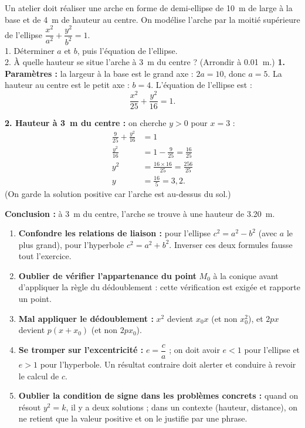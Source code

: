 \documentclass[11pt]{article}
\begin{document}
\begin{exoresolu}
Un atelier doit réaliser une arche en forme de demi-ellipse de \SI{10}{m} de large à la base et de \SI{4}{m} de hauteur au centre. On modélise l'arche par la moitié supérieure de l'ellipse $\dfrac{x^2}{a^2}+\dfrac{y^2}{b^2}=1$.\\
1. Déterminer $a$ et $b$, puis l'équation de l'ellipse.\\
2. À quelle hauteur se situe l'arche à \SI{3}{m} du centre ? (Arrondir à \SI{0,01}{m}.)
\tcblower
\textbf{1. Paramètres :} la largeur à la base est le grand axe : $2a=10$, donc $a=5$. La hauteur au centre est le petit axe : $b=4$. L'équation de l'ellipse est :
\[\frac{x^2}{25}+\frac{y^2}{16}=1.\]

\textbf{2. Hauteur à \SI{3}{m} du centre :} on cherche $y>0$ pour $x=3$ :
\begin{align*}
\frac{9}{25}+\frac{y^2}{16}&=1\\
\frac{y^2}{16}&=1-\frac{9}{25}=\frac{16}{25}\\
y^2&=\frac{16\times16}{25}=\frac{256}{25}\\
y&=\frac{16}{5}=3{,}2.
\end{align*}
(On garde la solution positive car l'arche est au-dessus du sol.)

\textbf{Conclusion :} à \SI{3}{m} du centre, l'arche se trouve à une hauteur de \SI{3,20}{m}.
\end{exoresolu}

\begin{attention}
\begin{enumerate}
\item \textbf{Confondre les relations de liaison :} pour l'ellipse $c^2=a^2-b^2$ (avec $a$ le plus grand), pour l'hyperbole $c^2=a^2+b^2$. Inverser ces deux formules fausse tout l'exercice.
\item \textbf{Oublier de vérifier l'appartenance du point} $M_0$ à la conique avant d'appliquer la règle du dédoublement : cette vérification est exigée et rapporte un point.
\item \textbf{Mal appliquer le dédoublement :} $x^2$ devient $x_0x$ (et non $x_0^2$), et $2px$ devient $p(x+x_0)$ (et non $2px_0$).
\item \textbf{Se tromper sur l'excentricité :} $e=\dfrac{c}{a}$ ; on doit avoir $e<1$ pour l'ellipse et $e>1$ pour l'hyperbole. Un résultat contraire doit alerter et conduire à revoir le calcul de $c$.
\item \textbf{Oublier la condition de signe dans les problèmes concrets :} quand on résout $y^2=k$, il y a deux solutions ; dans un contexte (hauteur, distance), on ne retient que la valeur positive et on le justifie par une phrase.
\end{enumerate}
\end{attention}
\end{document}
